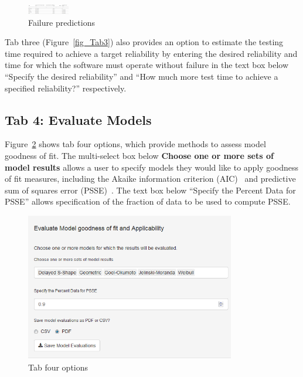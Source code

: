 \documentclass[journal]{IEEEtran}
\begin{document}
\begin{figure}[!h]
\centering
\includegraphics[width=\textwidth]{Figures/Tab3-table}%
\caption{Failure predictions}
\label{fig_Tab3-table}
\end{figure}



Tab three (Figure~\ref{fig_Tab3}) also provides an option to estimate the testing time required to achieve a target reliability by entering the desired reliability and time for which the software must operate without failure in the text box below ``Specify the desired reliability'' and ``How much more test time to achieve a specified reliability?'' respectively.


\subsection{Tab 4: Evaluate Models}\label{tab4}
Figure~\ref{fig_SRT_tab4} shows tab four options, which provide methods to assess model goodness of fit. The multi-select box below \textbf{Choose one or more sets of model results} allows a user to specify models they would like to apply goodness of fit measures, including the Akaike information criterion (AIC)~\cite{akaike1974new} and predictive sum of squares error (PSSE)~\cite{fiondella2011software}. The text box below ``Specify the Percent Data for PSSE'' allows specification of the fraction of data to be used to compute PSSE.

\begin{figure}[!h]
\centering%
\includegraphics[width=3.6in]{Figures/Fig16}
\caption{Tab four options}
\label{fig_SRT_tab4}
\end{figure}
\end{document}
